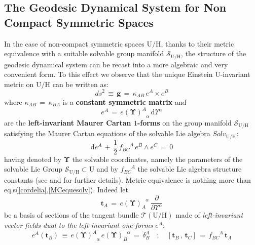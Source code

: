 \documentclass[10pt,a4paper]{article}
\newcommand{\ft}[2]{{\textstyle\frac{#1}{#2}}}
\begin{document}
\subsection{The Geodesic Dynamical System for Non Compact Symmetric Spaces}
\label{zaklyuchenie}
In the case of non-compact symmetric spaces $\mathrm{U/H}$, thanks to their metric equivalence with a suitable solvable group manifold $\mathcal{S}_{\mathrm{U/H}}$, the structure of the geodesic dynamical system can be recast into a more algebraic and very convenient form. To this effect we observe that the unique Einstein $\mathrm{U}$-invariant metric on $\mathrm{U/H}$ can be written
as:
\begin{equation}\label{cordelia}
  ds^2 \, \equiv \, \mathbf{g} \, = \, \kappa_{AB} \, e^A \times e^B
\end{equation}
where $\kappa_{AB}\, = \, \kappa_{BA}$ is a \textbf{constant symmetric matrix} and
\begin{equation}\label{forminesabbia}
  e^A \, = \, e(\boldsymbol{\Upsilon})^{A}_{\phantom{A}\alpha} \, \mathrm{d}\Upsilon^\alpha
\end{equation}
are the \textbf{left-invariant Maurer Cartan $1$-forms} on the group manifold $\mathcal{S}_{\mathrm{U/H}}$ satisfying the Maurer Cartan equations of the solvable Lie algebra $Solv_{\mathrm{U/H}}$:
\begin{equation}\label{MCequesolv}
  \mathrm{d}e^A \, + \, \ft{1}{2} \, f^{\phantom{BC}A}_{BC} \, e^B \wedge e^C \, = \, 0
\end{equation}
having denoted by $\boldsymbol{\Upsilon}$ the solvable coordinates, namely the parameters of the solvable Lie Group
$\mathcal{S}_{\mathrm{U/H}} \subset \mathrm{U}$ and by $f^{\phantom{BC}A}_{BC}$ the solvable Lie algebra structure constants (see \cite{pgtstheory} and \cite{TSnaviga} for further details).
Metric equivalence is nothing more than  eq.s(\ref{cordelia},\ref{MCequesolv}). Indeed let
\begin{equation}\label{cartaccia}
  \mathbf{t}_A \, = \, e(\boldsymbol{\Upsilon})^{\phantom{A}\alpha}_A \,   \frac{\partial}{\partial \Upsilon^\alpha}
\end{equation}
be a basis of sections of the tangent bundle $\mathcal{T}(\mathrm{U/H})$ made of \textit{left-invariant vector fields dual to the left-invariant one-forms $e^A$}:
\begin{equation}\label{neanderthal}
  e^A\left(\mathbf{t}_B\right) \, \equiv \, e(\boldsymbol{\Upsilon})^{A}_{\phantom{A}\alpha}\, e(\boldsymbol{\Upsilon})^{\phantom{B}\alpha}_B \, = \, \delta^A_B \quad ; \quad \left[ \mathbf{t}_B \, , \, \mathbf{t}_C\right] \, = \, f^{\phantom{BC}A}_{BC} \,\mathbf{t}_A
\end{equation}
\end{document}
